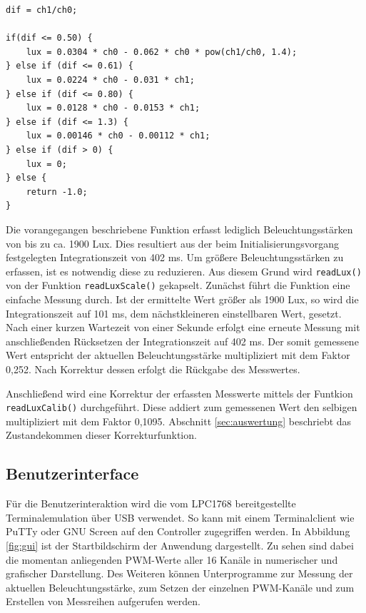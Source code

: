 \documentclass[a4paper,12pt]{scrartcl}
\begin{document}
\begin{lstlisting}[captionpos=b, caption=Berechnung der Beleuchtungsstärke aus Full-Range- und IR-Photodiode analog dem im Datenblatt beschriebenen Verfahren \cite{tsl2561}, label=code:calclux]
dif = ch1/ch0;

if(dif <= 0.50) {
    lux = 0.0304 * ch0 - 0.062 * ch0 * pow(ch1/ch0, 1.4);
} else if (dif <= 0.61) {
    lux = 0.0224 * ch0 - 0.031 * ch1;
} else if (dif <= 0.80) {
    lux = 0.0128 * ch0 - 0.0153 * ch1;
} else if (dif <= 1.3) {
    lux = 0.00146 * ch0 - 0.00112 * ch1;
} else if (dif > 0) {
    lux = 0;
} else {
    return -1.0;
}
\end{lstlisting}

Die vorangegangen beschriebene Funktion erfasst lediglich Beleuchtungsstärken von bis zu ca. 1900 Lux. Dies resultiert aus der beim Initialisierungsvorgang festgelegten Integrationszeit von 402 ms. Um größere Beleuchtungsstärken zu erfassen, ist es notwendig diese zu reduzieren. Aus diesem Grund wird \texttt{readLux()} von der Funktion \texttt{readLuxScale()} gekapselt. Zunächst führt die Funktion eine einfache Messung durch. Ist der ermittelte Wert größer als 1900 Lux, so wird die Integrationszeit auf 101 ms, dem nächstkleineren einstellbaren Wert, gesetzt. Nach einer kurzen Wartezeit von einer Sekunde erfolgt eine erneute Messung mit anschließenden Rücksetzen der Integrationszeit auf 402 ms. Der somit gemessene Wert entspricht der aktuellen Beleuchtungsstärke multipliziert mit dem Faktor 0,252. Nach Korrektur dessen erfolgt die Rückgabe des Messwertes.

Anschließend wird eine Korrektur der erfassten Messwerte mittels der Funtkion \texttt{readLuxCalib()} durchgeführt. Diese addiert zum gemessenen Wert den selbigen multipliziert mit dem Faktor 0,1095. Abschnitt \ref{sec:auswertung} beschriebt das Zustandekommen dieser Korrekturfunktion.

\subsection{Benutzerinterface}
Für die Benutzerinteraktion wird die vom LPC1768 bereitgestellte Terminalemulation über USB verwendet. So kann mit einem Terminalclient wie PuTTy oder GNU Screen auf den Controller zugegriffen werden. In Abbildung \ref{fig:gui} ist der Startbildschirm der Anwendung dargestellt. Zu sehen sind dabei die momentan anliegenden PWM-Werte aller 16 Kanäle in numerischer und grafischer Darstellung. Des Weiteren können Unterprogramme zur Messung der aktuellen Beleuchtungsstärke, zum Setzen der einzelnen PWM-Kanäle und zum Erstellen von Messreihen aufgerufen werden.
\end{document}

